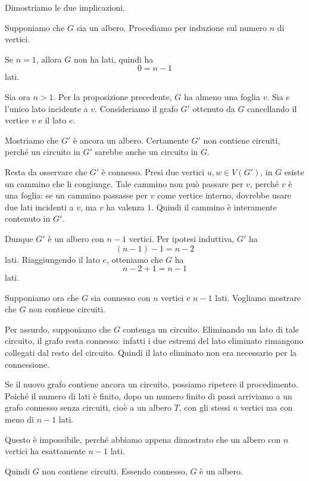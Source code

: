 \documentclass[a4paper]{article}
\begin{document}
\begin{snippetproof}{}
    Dimostriamo le due implicazioni.

    \begin{iffproof}
        \item Supponiamo che \(G\) sia un albero. Procediamo per induzione sul numero \(n\) di vertici.

        Se \(n=1\), allora \(G\) non ha lati, quindi ha
        \[
            0=n-1
        \]
        lati.

        Sia ora \(n>1\). Per la proposizione precedente, \(G\) ha almeno una foglia \(v\). Sia \(e\) l'unico lato incidente a \(v\). Consideriamo il grafo \(G'\) ottenuto da \(G\) cancellando il vertice \(v\) e il lato \(e\).

        Mostriamo che \(G'\) è ancora un albero. Certamente \(G'\) non contiene circuiti, perché un circuito in \(G'\) sarebbe anche un circuito in \(G\).

        Resta da osservare che \(G'\) è connesso. Presi due vertici \(u,w\in V(G')\), in \(G\) esiste un cammino che li congiunge. Tale cammino non può passare per \(v\), perché \(v\) è una foglia: se un cammino passasse per \(v\) come vertice interno, dovrebbe usare due lati incidenti a \(v\), ma \(v\) ha valenza \(1\). Quindi il cammino è interamente contenuto in \(G'\).

        Dunque \(G'\) è un albero con \(n-1\) vertici. Per ipotesi induttiva, \(G'\) ha
        \[
            (n-1)-1=n-2
        \]
        lati. Riaggiungendo il lato \(e\), otteniamo che \(G\) ha
        \[
            n-2+1=n-1
        \]
        lati.

        \item Supponiamo ora che \(G\) sia connesso con \(n\) vertici e \(n-1\) lati. Vogliamo mostrare che \(G\) non contiene circuiti.

        Per assurdo, supponiamo che \(G\) contenga un circuito. Eliminando un lato di tale circuito, il grafo resta connesso: infatti i due estremi del lato eliminato rimangono collegati dal resto del circuito. Quindi il lato eliminato non era necessario per la connessione.

        Se il nuovo grafo contiene ancora un circuito, possiamo ripetere il procedimento. Poiché il numero di lati è finito, dopo un numero finito di passi arriviamo a un grafo connesso senza circuiti, cioè a un albero \(T\), con gli stessi \(n\) vertici ma con meno di \(n-1\) lati.

        Questo è impossibile, perché abbiamo appena dimostrato che un albero con \(n\) vertici ha esattamente \(n-1\) lati.

        Quindi \(G\) non contiene circuiti. Essendo connesso, \(G\) è un albero.
    \end{iffproof}
\end{snippetproof}
\end{document}
